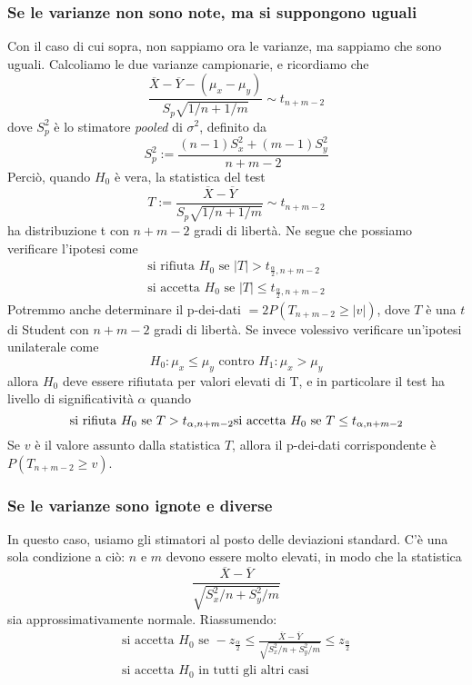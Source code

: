 \documentclass[11pt]{article}
\begin{document}
\subsubsection{Se le varianze non sono note, ma si suppongono uguali}
Con il caso di cui sopra, non sappiamo ora le varianze, ma sappiamo che sono uguali. Calcoliamo le due varianze campionarie, e ricordiamo che
\begin{displaymath}
    \frac{\overline{X}- \overline{Y} -(\mu_x-\mu_y)}{S_p\sqrt{1/n+1/m}} \sim t_{n+m-2}
\end{displaymath}
dove $S_p^2$ è lo stimatore \textit{pooled} di $\sigma^2$, definito da
\begin{displaymath}
    S_p^2 := \frac{(n-1)S_x^2+(m-1)S_y^2}{n+m-2}
\end{displaymath}
Perciò, quando $H_0$ è vera, la statistica del test 
\begin{displaymath}
    T:=\frac{\overline{X}- \overline{Y}}{S_p\sqrt{1/n+1/m}} \sim t_{n+m-2}
\end{displaymath}
ha distribuzione t con $n+m-2$ gradi di libertà. Ne segue che possiamo verificare l'ipotesi come
\begin{gather*}
    \mbox{si rifiuta }H_0\mbox{ se }|T|>t_{\frac{\alpha}{2},n+m-2}\\ 
    \mbox{si accetta }H_0\mbox{ se }|T| \le t_{\frac{\alpha}{2},n+m-2}
\end{gather*}
Potremmo anche determinare il p-dei-dati $= 2P(T_{n+m-2} \ge |v|)$, dove $T$ è una $t$ di Student con $n+m-2$ gradi di libertà. 
Se invece volessivo verificare un'ipotesi unilaterale come 
\begin{displaymath}
    H_0 : \mu_x \le \mu_y \mbox{ contro }H_1:\mu_x>\mu_y
\end{displaymath}
allora $H_0$ deve essere rifiutata per valori elevati di T, e in particolare il test ha livello di significatività $\alpha$ quando 
\begin{displaymath}
    \mbox{si rifiuta }H_0\mbox{ se } T>t_{\alpha,n+m-2}\\ 
    \mbox{si accetta }H_0\mbox{ se } T\le t_{\alpha,n+m-2}
\end{displaymath}
Se $v$ è il valore assunto dalla statistica $T$, allora il p-dei-dati corrispondente è $P(T_{n+m-2}\ge v)$.
\subsubsection{Se le varianze sono ignote e diverse}
In questo caso, usiamo gli stimatori al posto delle deviazioni standard. C'è una sola condizione a ciò: $n$ e $m$ devono essere molto elevati, in modo che la statistica 
\begin{displaymath}
    \frac{\overline{X}- \overline{Y}}{\sqrt{S_x^2/n+S_y^2/m}}
\end{displaymath}
sia approssimativamente normale.
Riassumendo:
\begin{gather*}
    \mbox{si accetta }H_0\mbox{ se }-z_{\frac{\alpha}{2}} \le \frac{\overline{X}- \overline{Y}}{\sqrt{S_x^2/n+S_y^2/m}}\le z_{\frac{\alpha}{2}}\\ 
    \mbox{si accetta }H_0\mbox{ in tutti gli altri casi}
\end{gather*}
\end{document}
